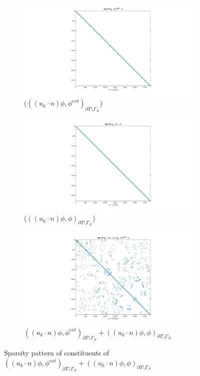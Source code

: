 \documentclass[a4paper,twoside,openright]{book}
\begin{document}
\begin{figure}[H]
\begin{subfigure}{\textwidth}
\centering
  \includegraphics[width=\linewidth]{figure81.jpg}
  \caption{($((u_k \cdot n)\phi,\phi^{ext})_{\partial T \setminus \Gamma_N}$)}
  \label{figure_81}
\end{subfigure}
\begin{subfigure}{\textwidth}	
\centering
  \includegraphics[width=\linewidth]{figure82.jpg}
  \caption{($((u_k \cdot n)\phi,\phi)_{\partial T \setminus \Gamma_N}$)}
  \label{figure_82}
\end{subfigure}
\begin{subfigure}{\textwidth}	
\centering
  \includegraphics[width=\linewidth]{figure8.jpg}
  \caption{$((u_k \cdot n)\phi,\phi^{ext})_{\partial T \setminus \Gamma_N} + ((u_k \cdot n)\phi,\phi)_{\partial T \setminus \Gamma_N}$}
  \label{figure_8}
\end{subfigure}
\caption{Sparsity pattern of constituents of $((u_k \cdot n)\phi,\phi^{ext})_{\partial T \setminus \Gamma_N} + ((u_k \cdot n)\phi,\phi)_{\partial T \setminus \Gamma_N}$}
\label{figure_8_all}
\end{figure}
\end{document}
